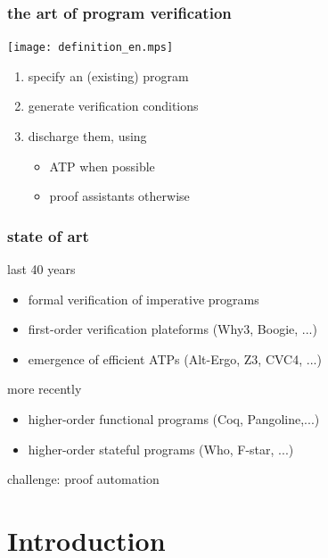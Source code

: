 \begin{frame}
\frametitle{the art of program verification}
\texttt{[image: definition\_en.mps]}
\bigskip\pause
  \begin{enumerate}
  \item {\red specify} an (existing) program \pause

  \item {\red generate} verification conditions \pause
  \item {\red discharge} them, using
    \begin{itemize}
    \item ATP when possible
    \item proof assistants otherwise
    \end{itemize}
  \end{enumerate}
\end{frame}

\begin{frame}
\frametitle{state of art}
{\red last 40 years}
	\begin{itemize}
		\item[] formal verification of imperative programs 
		\item[] first-order verification plateforms (Why3, Boogie, ...)
		\item[] emergence of efficient ATPs (Alt-Ergo, Z3, CVC4, ...)
	\end{itemize}\vspace*{1em} \pause
{\red more recently}
	\begin{itemize}
		\item[] higher-order functional programs (Coq, Pangoline,...)
		\item[] higher-order {\red stateful} programs (Who, F-star, ...)
	\end{itemize}
\pause
\bigskip
{\red challenge}: proof automation
\end{frame}

\section*{Introduction}
